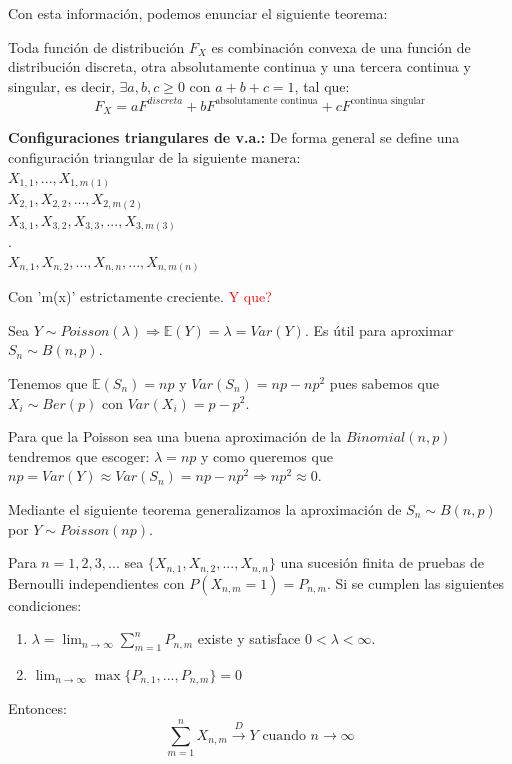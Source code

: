 \documentclass{apuntes}
\begin{document}
Con esta información, podemos enunciar el siguiente teorema:
\begin{theorem}
Toda función de distribución $F_X$ es combinación convexa de una función de distribución discreta, otra absolutamente continua y una tercera continua y singular, es decir, $\exists a,b,c \geq 0$ con $a+b+c=1$, tal que:
\[
F_X=aF^{discreta}+bF^{\text{absolutamente continua}}+cF^{\text{continua singular}}
\]
\end{theorem}

\textbf{Configuraciones triangulares de v.a.:}
De forma general se define una  configuración triangular de la siguiente manera:
\\
$X_{1,1},...,X_{1,m(1)}$\\
$X_{2,1}, X_{2,2},...,X_{2,m(2)}$\\
$X_{3,1}, X_{3,2}, X_{3,3},...,X_{3,m(3)}$\\
.\\
$X_{n,1}, X_{n,2},...,X_{n,n},...,X_{n,m(n)}$

Con 'm(x)' estrictamente creciente. \textcolor{red}{Y que?}

\begin{example}
Sea $Y\sim Poisson(\lambda) \Rightarrow \mathbb{E}(Y)=\lambda=Var(Y)$. Es útil para aproximar $S_n \sim B(n,p)$.

Tenemos que $\mathbb{E}(S_n)=np$ y $Var(S_n)=np-np^2$ pues sabemos que $X_i \sim Ber(p)$ con $Var(X_i)=p-p^2$.

Para que la Poisson sea una buena aproximación de la $Binomial(n,p)$ tendremos que escoger: $\lambda=np$ y como queremos que $np=Var(Y)\approx Var(S_n)=np-np^2 \Rightarrow np^2\approx0$.

Mediante el siguiente teorema generalizamos la aproximación de $S_n \sim B(n,p)$ por $Y\sim Poisson(np)$.
\end{example}

\begin{theorem}
Para $n=1,2,3,...$ sea $\{X_{n,1},X_{n,2},...,X_{n,n}\}$ una sucesión finita de pruebas de Bernoulli independientes con $P(X_{n,m}=1)=P_{n,m}$. Si se cumplen las siguientes condiciones:
\begin{enumerate}
\item $\lambda=\lim_{n \rightarrow \infty} \sum_{m=1}^{n}P_{n,m}$ existe y satisface $0<\lambda<\infty$.
\item $\lim_{n \rightarrow \infty} \max\{P_{n,1},...,P_{n,m}\}=0$
\end{enumerate}
Entonces: 
\[
\sum_{m=1}^{n}X_{n,m} \stackrel{D}{\rightarrow} Y \text{ cuando $n \rightarrow \infty$}
\]
\end{theorem}
\end{document}
